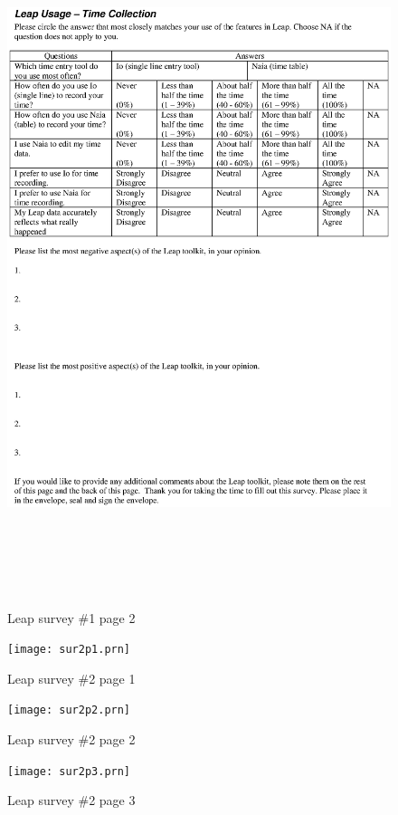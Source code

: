 \begin{figure}[htbp]
  \centering
  \includegraphics[height=8in]{sur1p2.eps}
  \caption{Leap survey \#1 page 2}
  \label{fig:survey1.2}
\end{figure}

\begin{figure}[htbp]
  \centering
  \texttt{[image: sur2p1.prn]}
  \caption{Leap survey \#2 page 1}
  \label{fig:survey2.1}
\end{figure}

\begin{figure}[htbp]
  \centering
  \texttt{[image: sur2p2.prn]}
  \caption{Leap survey \#2 page 2}
  \label{fig:survey2.2}
\end{figure}

\begin{figure}[htbp]
  \centering
  \texttt{[image: sur2p3.prn]}
  \caption{Leap survey \#2 page 3}
  \label{fig:survey2.3}
\end{figure}

